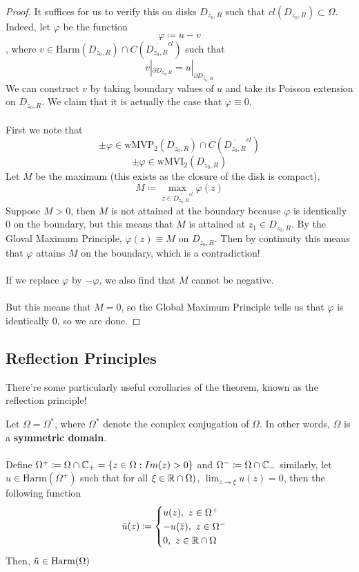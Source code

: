 \documentclass{article}
\begin{document}
\begin{proof}
    It suffices for us to verify this on disks $D_{z_0, R}$ such that $cl(D_{z_0, R}) \subset \Omega$. Indeed, let $\varphi$ be the function
    \[\varphi \coloneqq u - v\]
    , where $v \in \text{Harm}(D_{z_0, R}) \cap C(\overline{D_{z_0, R}}^{cl})$ such that
    \[v|_{\partial D_{z_0, R}} = u|_{\partial D_{z_0, R}}\]
    We can construct $v$ by taking boundary values of $u$ and take its Poisson extension on $D_{z_0, R}$. We claim that it is actually the case that $\varphi \equiv 0$.\\\\
    First we note that
    \[\pm \varphi \in \text{wMVP}_2(D_{z_0, R}) \cap C(\overline{D_{z_0, R}}^{cl})\]
    \[\pm \varphi \in \text{wMVI}_2(D_{z_0, R})\]
    Let $M$ be the maximum (this exists as the closure of the disk is compact),
    \[M \coloneqq \max_{z \in \overline{D_{z_0, R}}^{cl}} \varphi(z)\]
    Suppose $M > 0$, then $M$ is not attained at the boundary because $\varphi$ is identically $0$ on the boundary, but this means that $M$ is attained at $z_1 \in D_{z_0, R}$. By the Gloval Maximum Principle, $\varphi(z) \equiv M$ on $D_{z_0, R}$. Then by continuity this means that $\varphi$ attains $M$ on the boundary, which is a contradiction!\\\\
    If we replace $\varphi$ by $-\varphi$, we also find that $M$ cannot be negative.\\\\
    But this means that $M = 0$, so the Global Maximum Principle tells us that $\varphi$ is identically $0$, so we are done.
\end{proof}

\subsection{Reflection Principles}

There're some particularly useful corollaries of the theorem, known as the reflection principle!

\begin{corollary}
    Let $\Omega = \Omega^*$, where $\Omega^*$ denote the complex conjugation of $\Omega$. In other words, $\Omega$ is a \textbf{symmetric domain}.\\\\
    Define $\Omega^+ \coloneqq \Omega \cap \mathbb{C}_+ = \{z \in \Omega: Im(z) > 0\}$ and $\Omega^- \coloneqq \Omega \cap \mathbb{C}_-$ similarly, let $u \in \text{Harm}(\Omega^+)$ such that for all $\xi \in \mathbb{R} \cap \Omega)$, $\lim_{z \to \xi} u(z) = 0$, then the following function
    \[\Tilde{u}(z) \coloneqq \begin{cases}
    u(z),\ z \in \Omega^+\\
    -u(\overline{z}),\ z \in \Omega^-\\
    0,\ z \in \mathbb{R} \cap \Omega
    \end{cases}\]
    Then, $\Tilde{u} \in \text{Harm}(\Omega)$
\end{corollary}
\end{document}
